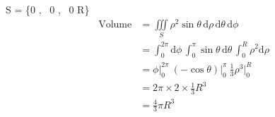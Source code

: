 S = \{0 \leq \phi {}\pi, \ 0 \leq \theta \leq \pi, \ 0 \leq \rho \leq R\}
\begin{align*}
\mathrm{Volume} &=\iiint\limits_S\! \rho^2 \sin\theta \,\mathrm{d}\rho \,\mathrm{d}\theta \,\mathrm{d}\phi \\
&=\int_0^{2 \pi }\! \mathrm{d}\phi \,\int_0^{ \pi }\! \sin\theta \,\mathrm{d}\theta \,\int_0^R\! \rho^2 \mathrm{d}\rho \\
&=\phi \Bigr|_0^{2\pi}\ (-\cos\theta) \Bigr|_0^{ \pi }\ \tfrac13 \rho^3 \Bigr|_0^R \\
&=2\pi \times 2 \times \tfrac13 R^3 \\
&=\tfrac43 \pi R^3
\end{align*}
